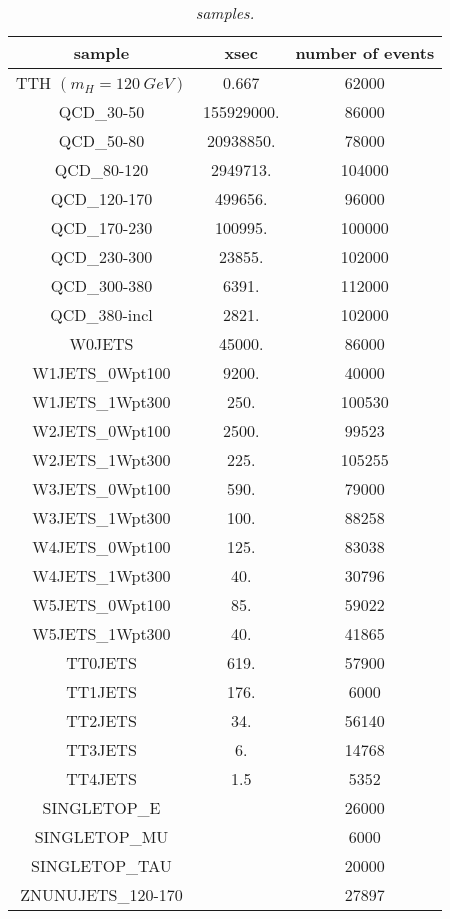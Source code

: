 \documentclass[12pt,a4paper,twoside,english]{report}
\begin{document}
\begin{table}[h!]
  \center
  \begin{tabular}{||c|c|c||}
    \hline
    \hline
    sample & xsec & number of events\\
    \hline
    TTH $(m_H=120\ GeV)$ & 0.667 & 62000\\
    \hline
    QCD\_30-50    & 155929000. &  86000\\
    QCD\_50-80    &  20938850. &  78000\\
    QCD\_80-120   &   2949713. & 104000\\ 
    QCD\_120-170  &    499656. &  96000\\
    QCD\_170-230  &    100995. & 100000\\
    QCD\_230-300  &     23855. & 102000\\
    QCD\_300-380  &      6391. & 112000\\
    QCD\_380-incl &      2821. & 102000\\
    \hline
    W0JETS          & 45000. &  86000\\
    W1JETS\_0Wpt100 &  9200. &  40000\\
    W1JETS\_1Wpt300 &   250. & 100530\\
    W2JETS\_0Wpt100 &  2500. &  99523\\
    W2JETS\_1Wpt300 &   225. & 105255\\
    W3JETS\_0Wpt100 &   590. &  79000\\
    W3JETS\_1Wpt300 &   100. &  88258\\
    W4JETS\_0Wpt100 &   125. &  83038\\
    W4JETS\_1Wpt300 &    40. &  30796\\
    W5JETS\_0Wpt100 &    85. &  59022\\
    W5JETS\_1Wpt300 &    40. &  41865\\
    \hline
    TT0JETS & 619.  & 57900\\
    TT1JETS & 176.  &  6000\\
    TT2JETS &  34.  & 56140\\
    TT3JETS &   6.  & 14768\\
    TT4JETS &   1.5 &  5352\\
    \hline
    SINGLETOP\_E   & & 26000\\
    SINGLETOP\_MU  & &  6000\\
    SINGLETOP\_TAU & & 20000\\
    \hline
    ZNUNUJETS\_120-170 & & 27897\\
    \hline
    \hline
  \end{tabular}
  \center\caption{\footnotesize{\em samples.}}
  \label{t:ttjets_sample}
\end{table}
\end{document}
